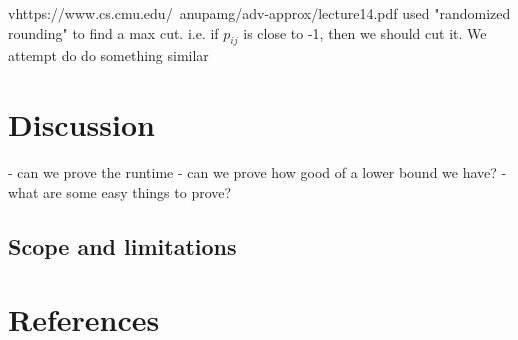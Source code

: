 \documentclass{article}
\begin{document}
vhttps://www.cs.cmu.edu/~anupamg/adv-approx/lecture14.pdf used "randomized rounding" to find a max cut.
i.e. if $p_{ij}$ is close to -1, then we should cut it. We attempt do do something similar

\section{Discussion}


- can we prove the runtime
- can we prove how good of a lower bound we have?
- what are some easy things to prove?

\subsection{Scope and limitations}

\section{References}
\end{document}

